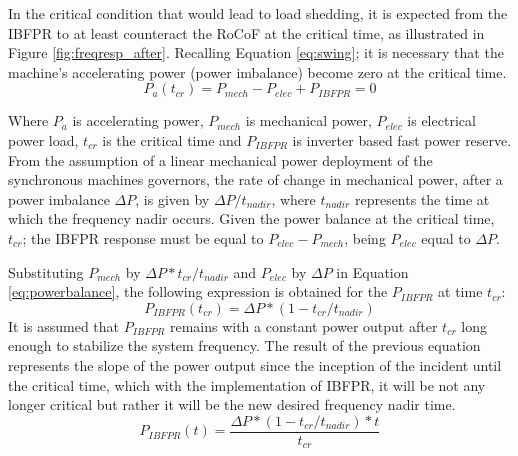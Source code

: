 In the critical condition that would lead to load shedding, it is expected from the IBFPR to at least counteract the RoCoF at the critical time, as illustrated in Figure \ref{fig:freqresp_after}.
Recalling Equation \eqref{eq:swing}; it is necessary that the machine’s accelerating power (power imbalance) become zero at the critical time.
\begin{equation}
	\label{eq:powerbalance}
	P_a (t_{cr} )=P_{mech}-P_{elec}+P_{IBFPR}=0
\end{equation}

Where $ P_a $ is accelerating power, $ P_{mech} $ is mechanical power, $ P_{elec} $ is electrical power load, $ t_{cr} $ is the critical time and $ P_{IBFPR} $ is inverter based fast power reserve.
From the assumption of a linear mechanical power deployment of the synchronous machines governors, the rate of change in mechanical power, after a power imbalance $ \Delta P $, is given by $ \Delta P/t_{nadir} $, where $ t_{nadir} $ represents the time at which the frequency nadir occurs. Given the power balance at the critical time, $ t_{cr} $; the IBFPR response must be equal to $ P_{elec}-P_{mech} $, being $ P_{elec} $ equal to $ \Delta P $. %


Substituting $ P_{mech} $ by $ \Delta P* t_{cr} /t_{nadir} $ and $ P_{elec} $ by $ \Delta P $ in Equation \eqref{eq:powerbalance}, the following expression is obtained for the $ P_{IBFPR} $ at time $ t_{cr} $:
\begin{equation}
	\label{eq:p_at_tcr}
	P_{IBFPR} (t_{cr} )=\Delta P*(1-t_{cr}/t_{nadir} )
\end{equation}
It is assumed that $ P_{IBFPR} $ remains with a constant power output after $ t_{cr} $ long enough to stabilize the system frequency. The result of the previous equation represents the slope of the power output since the inception of the incident until the critical time, which with the implementation of IBFPR, it will be not any longer critical but rather it will be the new desired frequency nadir time.
\begin{equation}
	\label{eq:IBFPR}
	P_{IBFPR} (t)=\dfrac{\Delta P*(1-t_{cr}/t_{nadir} )*t}{t_{cr}}
\end{equation}

